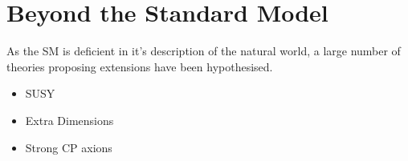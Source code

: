 \section{Beyond the Standard Model}
As the SM is deficient in it's description of the natural world, a large number of theories proposing extensions have been hypothesised.


{\color{Red}
\begin{itemize}
\item SUSY
\item Extra Dimensions
\item Strong CP axions 
\end{itemize}
}

